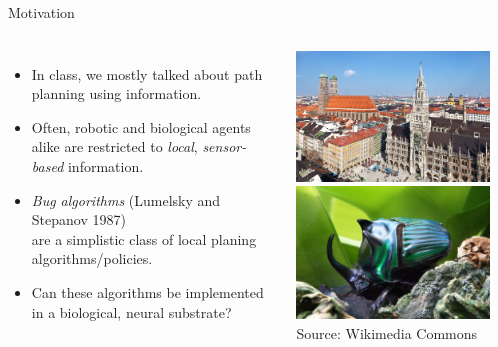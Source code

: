 \documentclass[aspectratio=169]{beamer}
\begin{document}
\begin{frame}{Motivation}

\begin{columns}
	\begin{itemize}
		\setlength{\itemsep}{0.4cm}
		\item<1-> In class, we mostly talked about path planning using \emph{\color{violet}{global}} information.
		\item<1-> Often, robotic and biological agents alike are restricted to \emph{\color{violet}local}, \emph{\color{violet}sensor-based} information.
		\item<2-> \emph{\color{violet}Bug algorithms} (Lumelsky and Stepanov 1987)\\
		are a simplistic class of local planing algorithms/policies.
		\item<3->[$\leadsto$] Can these algorithms be implemented in a biological, neural substrate?
	\end{itemize}
	\centering
	\includegraphics[width=0.9\textwidth]{media/munich_small.jpg}\\
	\includegraphics[width=0.9\textwidth]{media/bug_small.jpg}\\
	\footnotesize\color{aluminium4}Source: Wikimedia Commons
\end{columns}

\end{frame}
\end{document}
